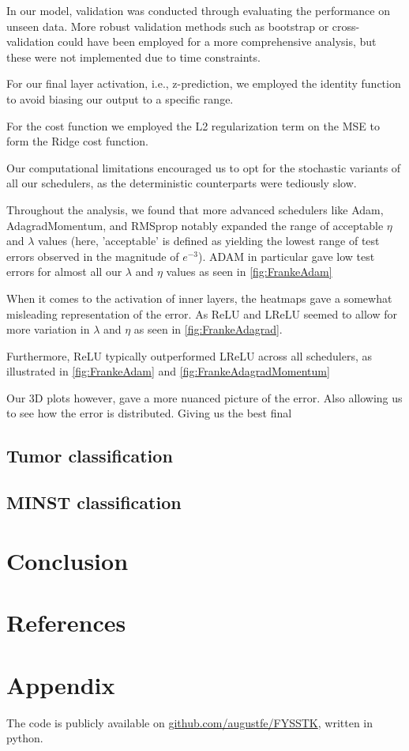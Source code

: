 \documentclass{article}
\theoremstyle{definition}
\begin{document}
In our model, validation was conducted through evaluating the performance on unseen data. More robust validation methods such as bootstrap or cross-validation could have been employed for a more comprehensive analysis, but these were not implemented due to time constraints.

For our final layer activation, i.e., z-prediction, we employed the identity function to avoid biasing our output to a specific range.

For the cost function we employed the L2 regularization term on the MSE to form the Ridge cost function.

Our computational limitations encouraged us to opt for the stochastic variants of all our schedulers, as the deterministic counterparts were tediously slow.

Throughout the analysis, we found that more advanced schedulers like Adam, AdagradMomentum, and RMSprop notably expanded the range of acceptable $\eta$ and $\lambda$ values (here, 'acceptable' is defined as yielding the lowest range of test errors observed in the magnitude of $e^{-3}$). ADAM in particular gave low test errors for almost all our $\lambda$ and $\eta$ values as seen in \autoref{fig:FrankeAdam} 

When it comes to the activation of inner layers, the heatmaps gave a somewhat misleading representation of the error. As ReLU and LReLU seemed to allow for more variation in $\lambda$  and $\eta$ as seen in  \autoref{fig:FrankeAdagrad}.

Furthermore, ReLU typically outperformed LReLU across all schedulers, as illustrated in \autoref{fig:FrankeAdam} and \autoref{fig:FrankeAdagradMomentum}

Our 3D plots however, gave a more nuanced picture of the error. Also allowing us to see how the error is distributed. Giving us the best final

\subsection{Tumor classification}


\subsection{MINST classification}


\section{Conclusion}


\section{References}

\printbibliography

\section{Appendix}
The code is publicly available on \href{https://github.com/augustfe/FYSSTK}{github.com/augustfe/FYSSTK}, written in python.
\end{document}
